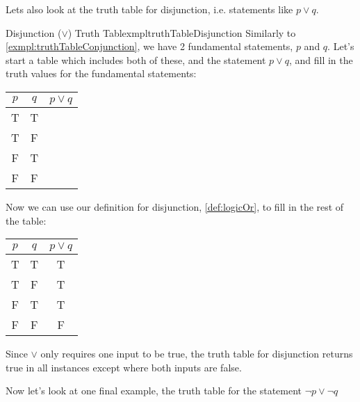 Lets also look at the truth table for disjunction, i.e. statements like $p \lor q$.

\begin{exmpl}[label={exmpl:truthTableDisjunction}]{Disjunction ($\lor$) Truth Table}{xmpltruthTableDisjunction}
    Similarly to \cref{exmpl:truthTableConjunction}, we have 2 fundamental statements, $p$ and $q$. Let's start a table which includes both of these, and the statement $p \lor q$, and fill in the truth values for the fundamental statements:
    \begin{center}
        \begin{tabular}{|c|c|c|}
            \hline
            $p$ & $q$ & $p \lor q$ \\
            \hline
            T   & T   &            \\
            \hline
            T   & F   &            \\
            \hline
            F   & T   &            \\
            \hline
            F   & F   &            \\
            \hline
        \end{tabular}
    \end{center}
    \vspace{0.5cm}
    Now we can use our definition for disjunction, \cref{def:logicOr}, to fill in the rest of the table: \begin{center}
        \begin{tabular}{|c|c|c|}
            \hline
            $p$ & $q$ & $p \lor q$ \\
            \hline
            T   & T   & T          \\
            \hline
            T   & F   & T          \\
            \hline
            F   & T   & T          \\
            \hline
            F   & F   & F          \\
            \hline
        \end{tabular}
    \end{center}
    \vspace{0.5cm}
    Since $\lor$ only requires one input to be true, the truth table for disjunction returns true in all instances except where both inputs are false.
\end{exmpl}

Now let's look at one final example, the truth table for the statement $\lnot p \lor \lnot q$
\newpage

